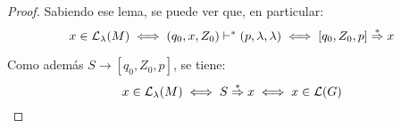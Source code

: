 \begin{proof}
    Sabiendo ese lema, se puede ver que, en particular:
    $$
        x \in \mathcal{L}_\lambda(M) \iff (q_0, x, Z_0) \vdash^* (p, \lambda, \lambda) \iff [q_0, Z_0, p] \overset{*}{\Rightarrow} x
    $$

    Como además $S \to [q_0, Z_0, p]$, se tiene:
    $$
        x \in \mathcal{L}_\lambda(M) \iff S \overset{*}{\Rightarrow} x \iff x \in \mathcal{L}(G)
    $$
\end{proof}

